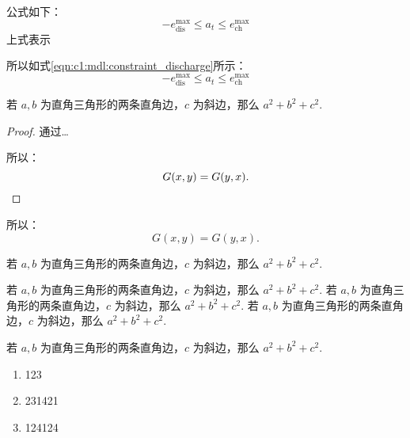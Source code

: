 

公式如下：
\begin{equation}
    -e^{\max}_\text{dis} \leq a_t \leq e^{\max}_\text{ch}\label{eqn:c1:mdl:constraint_discharge}
\end{equation}
上式表示

所以如式\eqref{eqn:c1:mdl:constraint_discharge}所示：
\begin{equation}
    -e^{\max}_\text{dis} \leq a_t \leq e^{\max}_\text{ch}
\end{equation}


\begin{theorem}[勾股定理]
    若 $a,b$ 为直角三角形的两条直角边，$c$ 为斜边，那么 $a^2 + b^2 + c^2.$
\end{theorem}

\begin{proof}
    通过\ldots

    所以：
    \begin{equation*}
        G(x, y) = G(y, x).  \qedhere
    \end{equation*}
\end{proof}

\begin{proposition}
  所以：
  \begin{equation*}
      G(x, y) = G(y, x).
  \end{equation*}
\end{proposition}

\begin{conjecture}[勾股定理]
    若 $a,b$ 为直角三角形的两条直角边，$c$ 为斜边，那么 $a^2 + b^2 + c^2.$
\end{conjecture}

\begin{axiom}[勾股定理]
    若 $a,b$ 为直角三角形的两条直角边，$c$ 为斜边，那么 $a^2 + b^2 + c^2.$ 若 $a,b$ 为直角三角形的两条直角边，$c$ 为斜边，那么 $a^2 + b^2 + c^2.$ 若 $a,b$ 为直角三角形的两条直角边，$c$ 为斜边，那么 $a^2 + b^2 + c^2.$
\end{axiom}

\begin{definition}[勾股定理]
    若 $a,b$ 为直角三角形的两条直角边，$c$ 为斜边，那么 $a^2 + b^2 + c^2.$
\end{definition}



\begin{enumerate}
  \item 123
  \item 231421
  \item 124124
\end{enumerate}
